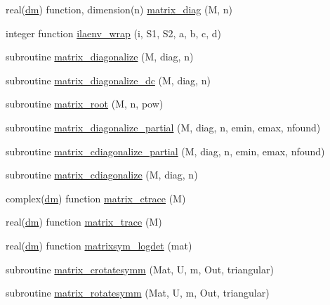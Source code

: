 \begin{DoxyCompactItemize}
\item 
real(\mbox{\hyperlink{namespacematrixutils_a7bdc564986ea4d90f51201c75606ef3d}{dm}}) function, dimension(n) \mbox{\hyperlink{namespacematrixutils_a6b563974ed42131dcdd0b7c5e009fb33}{matrix\+\_\+diag}} (M, n)
\item 
integer function \mbox{\hyperlink{namespacematrixutils_af41b3d5784e02032b5e22a16d76eca49}{ilaenv\+\_\+wrap}} (i, S1, S2, a, b, c, d)
\item 
subroutine \mbox{\hyperlink{namespacematrixutils_aa94ed3ad0cf6b18002c5f8ca9cd8b948}{matrix\+\_\+diagonalize}} (M, diag, n)
\item 
subroutine \mbox{\hyperlink{namespacematrixutils_a03b181040e90fb7d7693f10d0716a04f}{matrix\+\_\+diagonalize\+\_\+dc}} (M, diag, n)
\item 
subroutine \mbox{\hyperlink{namespacematrixutils_a76928f01b83f388ddb51ee3e256cd3a5}{matrix\+\_\+root}} (M, n, pow)
\item 
subroutine \mbox{\hyperlink{namespacematrixutils_a1f7b4399f422b8532d242374454b9e03}{matrix\+\_\+diagonalize\+\_\+partial}} (M, diag, n, emin, emax, nfound)
\item 
subroutine \mbox{\hyperlink{namespacematrixutils_a30f09f7f2856414c7cfdc635a108039a}{matrix\+\_\+cdiagonalize\+\_\+partial}} (M, diag, n, emin, emax, nfound)
\item 
subroutine \mbox{\hyperlink{namespacematrixutils_a29011a04a13e1b49c36d226591b3e5a4}{matrix\+\_\+cdiagonalize}} (M, diag, n)
\item 
complex(\mbox{\hyperlink{namespacematrixutils_a7bdc564986ea4d90f51201c75606ef3d}{dm}}) function \mbox{\hyperlink{namespacematrixutils_af3bd404fd6685b9f8d2863bb4a3c06e4}{matrix\+\_\+ctrace}} (M)
\item 
real(\mbox{\hyperlink{namespacematrixutils_a7bdc564986ea4d90f51201c75606ef3d}{dm}}) function \mbox{\hyperlink{namespacematrixutils_aba34e30d438cd387bb0f57e16d60b364}{matrix\+\_\+trace}} (M)
\item 
real(\mbox{\hyperlink{namespacematrixutils_a7bdc564986ea4d90f51201c75606ef3d}{dm}}) function \mbox{\hyperlink{namespacematrixutils_a4117e3e0068005bf79a0db9745a8dde6}{matrixsym\+\_\+logdet}} (mat)
\item 
subroutine \mbox{\hyperlink{namespacematrixutils_a289ea264af6294e91e4906d329ab1bca}{matrix\+\_\+crotatesymm}} (Mat, U, m, Out, triangular)
\item 
subroutine \mbox{\hyperlink{namespacematrixutils_aec8c0f5500ce3fccc5a427276bbc95d2}{matrix\+\_\+rotatesymm}} (Mat, U, m, Out, triangular)

\end{DoxyCompactItemize}
